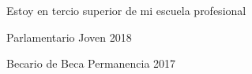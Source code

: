 

\begin{scholarship}
					{Estoy en tercio superior de mi escuela profesional}
					
					{Parlamentario Joven 2018}
					
					{Becario de Beca Permanencia 2017}
\end{scholarship}
